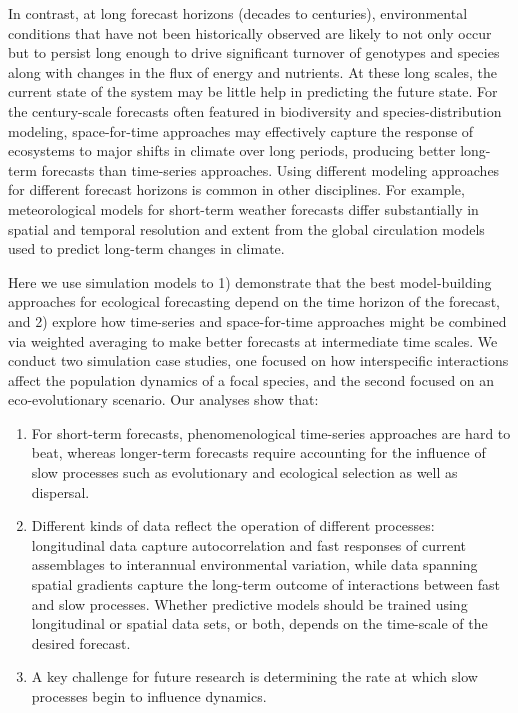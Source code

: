 \documentclass[11pt]{article}
\begin{document}
In contrast, at long forecast horizons (decades to centuries),  environmental conditions that have not been 
historically observed are likely to not only occur but to persist long enough to drive significant turnover of genotypes and species 
along with changes in the flux of energy and nutrients.  At these long scales, the current state of the system may be 
little help in predicting the future state. For the century-scale forecasts often featured in biodiversity and 
species-distribution modeling, space-for-time approaches may effectively capture the response of ecosystems to major shifts 
in climate over long periods, producing better long-term forecasts than time-series approaches. 
Using different modeling approaches for different forecast horizons is common in other disciplines.
For example, meteorological models for short-term weather forecasts differ substantially in spatial
and temporal resolution and extent from the global circulation models used to predict long-term changes
in climate.

Here we use simulation models to 1) demonstrate that the best model-building approaches for ecological forecasting 
depend on the time horizon of the forecast, and 2) explore how time-series and space-for-time approaches might be 
combined via weighted averaging to make better forecasts at intermediate time scales. We conduct two simulation case studies, one 
focused on how interspecific interactions affect the population dynamics of a focal species, and the second focused on
an eco-evolutionary scenario. Our analyses show that: 
\begin{enumerate}
	\item For short-term forecasts, phenomenological time-series approaches are hard to beat, whereas longer-term forecasts require accounting for the influence of slow processes such as evolutionary and ecological selection as well as dispersal.
	\item Different kinds of data reflect the operation of different processes: longitudinal data capture autocorrelation and fast responses of current assemblages to interannual environmental variation, while data spanning spatial gradients capture the long-term outcome of interactions between fast and slow processes.  Whether predictive models should be trained using longitudinal or spatial data sets, or both, depends on the time-scale of the desired forecast.
	\item A key challenge for future research is determining the rate at which slow processes begin to influence dynamics.
\end{enumerate}
\end{document}
